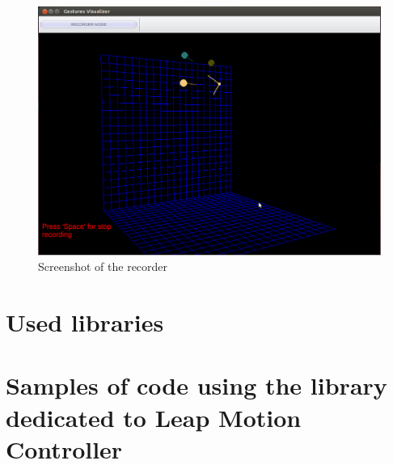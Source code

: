 \begin{figure}[htb]
\centering
 \includegraphics[width=1\columnwidth]{figures/recorder.png}
 \caption{Screenshot of the recorder}
 \label{recorder}
\end{figure}

\section{Used libraries}

\section{Samples of code using the library dedicated to Leap Motion Controller}
